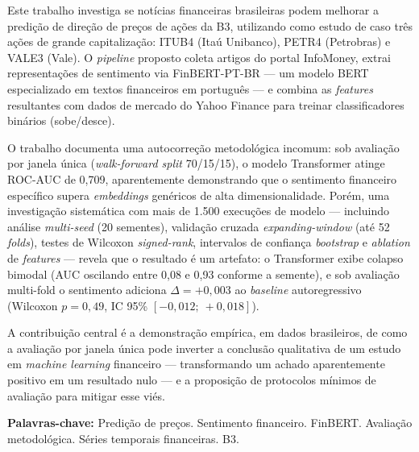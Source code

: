 \documentclass[
    12pt,
    openright,
    oneside,
    a4paper,
    english,
    brazil
]{abntex2}
\begin{document}
\frenchspacing

\imprimircapa

\imprimirfolhaderosto*


\begin{resumo}
Este trabalho investiga se notícias financeiras brasileiras podem melhorar a predição de direção de preços de ações da B3, utilizando como estudo de caso três ações de grande capitalização: ITUB4 (Itaú Unibanco), PETR4 (Petrobras) e VALE3 (Vale). O \textit{pipeline} proposto coleta artigos do portal InfoMoney, extrai representações de sentimento via FinBERT-PT-BR --- um modelo BERT especializado em textos financeiros em português \cite{souza2023} --- e combina as \textit{features} resultantes com dados de mercado do Yahoo Finance para treinar classificadores binários (sobe/desce).

O trabalho documenta uma autocorreção metodológica incomum: sob avaliação por janela única (\textit{walk-forward split} 70/15/15), o modelo Transformer \cite{vaswani2017} atinge ROC-AUC de 0,709, aparentemente demonstrando que o sentimento financeiro específico supera \textit{embeddings} genéricos de alta dimensionalidade. Porém, uma investigação sistemática com mais de 1.500 execuções de modelo --- incluindo análise \textit{multi-seed} (20 sementes), validação cruzada \textit{expanding-window} (até 52 \textit{folds}), testes de Wilcoxon \textit{signed-rank}, intervalos de confiança \textit{bootstrap} e \textit{ablation} de \textit{features} --- revela que o resultado é um artefato: o Transformer exibe colapso bimodal (AUC oscilando entre 0,08 e 0,93 conforme a semente), e sob avaliação multi-fold o sentimento adiciona $\Delta = +0{,}003$ ao \textit{baseline} autoregressivo (Wilcoxon $p = 0{,}49$, IC 95\% $[-0{,}012;\ +0{,}018]$).

A contribuição central é a demonstração empírica, em dados brasileiros, de como a avaliação por janela única pode inverter a conclusão qualitativa de um estudo em \textit{machine learning} financeiro --- transformando um achado aparentemente positivo em um resultado nulo --- e a proposição de protocolos mínimos de avaliação para mitigar esse viés.

\textbf{Palavras-chave:} Predição de preços. Sentimento financeiro. FinBERT. Avaliação metodológica. Séries temporais financeiras. B3.
\end{resumo}
\end{document}
